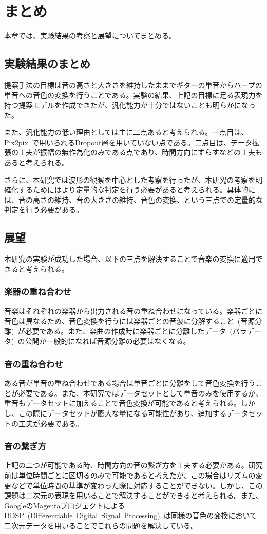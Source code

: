 \chapter{まとめ}

本章では、実験結果の考察と展望についてまとめる。

\section{実験結果のまとめ}

提案手法の目標は音の高さと大きさを維持したままでギターの単音からハープの単音への音色の変換を行うことである。実験の結果、上記の目標に足る表現力を持つ提案モデルを作成できたが、汎化能力が十分ではないことも明らかになった。

また、汎化能力の低い理由としては主に二点あると考えられる。一点目は、Pix2pix~\cite{pix2pix}で用いられるDropout層を用いていない点である。二点目は、データ拡張の工夫が振幅の無作為化のみである点であり、時間方向にずらすなどの工夫もあると考えられる。

さらに、本研究では波形の観察を中心とした考察を行ったが、本研究の考察を明確化するためにはより定量的な判定を行う必要があると考えられる。具体的には、音の高さの維持、音の大きさの維持、音色の変換、という三点での定量的な判定を行う必要がある。

\section{展望}

本研究の実験が成功した場合、以下の三点を解決することで音楽の変換に適用できると考えられる。

\subsection{楽器の重ね合わせ}

音楽はそれぞれの楽器から出力される音の重ね合わせになっている。楽器ごとに音色は異なるため、音色変換を行うには楽器ごとの音波に分解すること~(音源分離)~が必要である。また、楽曲の作成時に楽器ごとに分離したデータ~(パラデータ)~の公開が一般的になれば音源分離の必要はなくなる。

\subsection{音の重ね合わせ}

ある音が単音の重ね合わせである場合は単音ごとに分離をして音色変換を行うことが必要である。また、本研究ではデータセットとして単音のみを使用するが、重音もデータセットに加えることで音色変換が可能であると考えられる。しかし、この際にデータセットが膨大な量になる可能性があり、追加するデータセットの工夫が必要である。

\subsection{音の繋ぎ方}

上記の二つが可能である時、時間方向の音の繋ぎ方を工夫する必要がある。研究前は単位時間ごとに区切るのみで可能であると考えたが、この場合はリズムの変更などで単位時間の基準が変わった際に対応することができない。しかし、この課題は二次元の表現を用いることで解決することができると考えられる。また、GoogleのMagentaプロジェクトによるDDSP~(Differentiable~Digital~Signal~Processing)~\cite{DDSP}は同様の音色の変換において二次元データを用いることでこれらの問題を解決している。